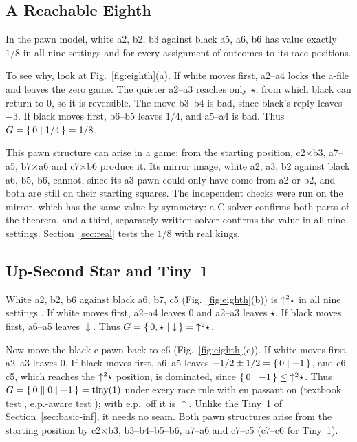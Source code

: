 \subsection{A Reachable Eighth}

\begin{theorem}[\lab{C2}]\label{thm:eighth}
In the pawn model, white a2, b2, b3 against black a5, a6, b6 has value exactly $1/8$ in all nine settings
and for every assignment of outcomes to its race positions.
\end{theorem}

To see why, look at Fig.~\ref{fig:eighth}(a). If white moves first, a2--a4 locks the a-file and leaves the
zero game. The quieter a2--a3 reaches only $\star$, from which black can return to $0$, so it is reversible.
The move b3--b4 is bad, since black's reply leaves $-3$. If black moves first, b6--b5 leaves $1/4$, and
a5--a4 is bad. Thus $G=\{\,0 \mid 1/4\,\}=1/8$.

This pawn structure can arise in a game: from the starting position, c2$\times$b3, a7--a5, b7$\times$a6 and
c7$\times$b6 produce it. Its mirror image, white a2, a3, b2 against black a6, b5, b6, cannot, since its
a3-pawn could only have come from a2 or b2, and both are still on their starting squares. The independent
checks were run on the mirror, which has the same value by symmetry: a C solver confirms both parts of the
theorem, and a third, separately written solver confirms the value in all nine settings. Section~\ref{sec:real} tests the $1/8$ with real kings.

\subsection{Up-Second Star and Tiny~1}
White a2, b2, b6 against black a6, b7, c5 (Fig.~\ref{fig:eighth}(b)) is $\mathord{\uparrow^{2}}\star$ in all nine settings
. If white moves first, a2--a4 leaves $0$ and a2--a3 leaves $\star$. If black moves first, a6--a5
leaves ${\downarrow}$. Thus $G=\{\,0,\star \mid {\downarrow}\,\}=\mathord{\uparrow^{2}}\star$.

Now move the black c-pawn back to c6 (Fig.~\ref{fig:eighth}(c)). If white moves first, a2--a3 leaves $0$.
If black moves first, a6--a5 leaves $-1/2\pm1/2=\{\,0 \mid -1\,\}$, and c6--c5, which reaches the $\mathord{\uparrow^{2}}\star$
position, is dominated, since $\{\,0 \mid -1\,\}\le\mathord{\uparrow^{2}}\star$. Thus $G=\{\,0 \parallel 0\mid -1\,\}=\operatorname{tiny}(1)$ under
every race rule with en passant on (textbook test , e.p.-aware test ); with e.p.\ off it is
${\uparrow}$. Unlike the Tiny~1 of Section~\ref{sec:basic-inf}, it needs no seam. Both pawn structures
arise from the starting position by c2$\times$b3, b3--b4--b5--b6, a7--a6 and c7--c5 (c7--c6 for Tiny~1).


